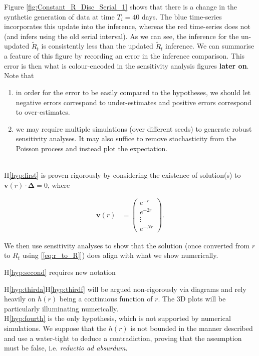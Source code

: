 \documentclass[10pt,journal,compsoc]{IEEEtran}
\begin{document}
Figure \ref{fig:Constant_R_Disc_Serial_1} shows that there is a change in the synthetic generation of data at time $T_i=40$ days. The blue time-series incorporates this update into the inference, whereas the red time-series does not (and infers using the old serial interval). As we can see, the inference for the un-updated $\tilde{R}_t$ is consistently less than the updated $\tilde{R}_t$ inference. We can summarise a feature of this figure by recording an error in the inference comparison. This error is then what is colour-encoded in the sensitivity analysis figures \textbf{later on}. Note that 
\begin{enumerate}
    \item in order for the error to be easily compared to the hypotheses, we should let negative errors correspond to under-estimates and positive errors correspond to over-estimates.
    \item we may require multiple simulations (over different seeds) to generate robust sensitivity analyses. It may also suffice to remove stochasticity from the Poisson process and instead plot the expectation.
\end{enumerate}
\\

H\ref{hyp:first} is proven rigorously by considering the existence of solution(s) to $\boldsymbol{v}(r) \cdot \boldsymbol{\Delta}=0$, where

  \begin{align*}
    \boldsymbol{v}(r) &= \begin{pmatrix}
           e^{-r} \\
           e^{-2r} \\
           \vdots \\
           e^{-Nr}
         \end{pmatrix}.
  \end{align*}

We then use sensitivity analyses to show that the solution (once converted from $r$ to $R_t$ using [\ref{eq:r_to_R}]) does align with what we show numerically.

H\ref{hyp:second} requires new notation

H\ref{hyp:thirda}H\ref{hyp:thirdf} will be argued non-rigorously via diagrams and rely heavily on $h(r)$ being a continuous function of $r$. The 3D plots will be particularly illuminating numerically.\\



H\ref{hyp:fourth} is the only hypothesis, which is not supported by numerical simulations. We suppose that the $h(r)$ is not bounded in the manner described and use a water-tight to deduce a contradiction, proving that the assumption must be false, i.e. \textit{reductio ad absurdum}.
\end{document}
